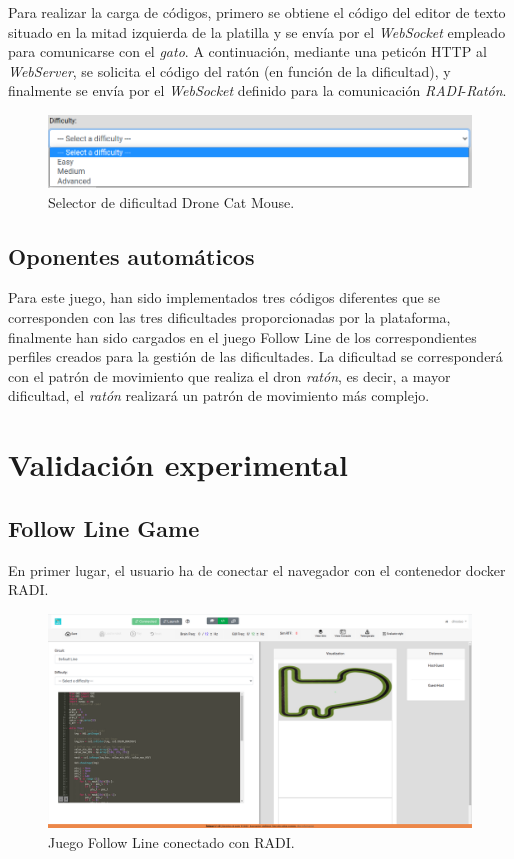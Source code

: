 \documentclass[a4paper, 12pt]{book}
\begin{document}
Para realizar la carga de códigos, primero se obtiene el código del editor de texto situado en la mitad izquierda de la platilla y se envía por el \emph{WebSocket} empleado para comunicarse con el \emph{gato}. A continuación, mediante una peticón HTTP al \emph{WebServer}, se solicita el código del ratón (en función de la dificultad), y finalmente se envía por el \emph{WebSocket} definido para la comunicación  \emph{RADI}-\emph{Ratón}.

\begin{figure}[H]
	\centering
    \includegraphics[width=15cm]{img/drone_cat_mouse_difficulty.png}
    \caption{Selector de dificultad Drone Cat Mouse.}
    \label{figura:evaluator_drone}
\end{figure}

\subsection{Oponentes automáticos}

Para este juego, han sido implementados tres códigos diferentes que se corresponden con las tres dificultades proporcionadas por la plataforma, finalmente han sido cargados en el juego Follow Line de los correspondientes perfiles creados para la gestión de las dificultades. La dificultad se corresponderá con el patrón de movimiento que realiza el dron \emph{ratón}, es decir, a mayor dificultad, el \emph{ratón} realizará un patrón de movimiento más complejo.

\section{Validación experimental}

\subsection{Follow Line Game}

En primer lugar, el usuario ha de conectar el navegador con el contenedor docker RADI.

\begin{figure}[H]
	\centering
    \includegraphics[width=12cm]{img/fl_radi_connected.png}
    \caption{Juego Follow Line conectado con RADI.}
    \label{figura:evaluator_drone}
\end{figure}
\end{document}
